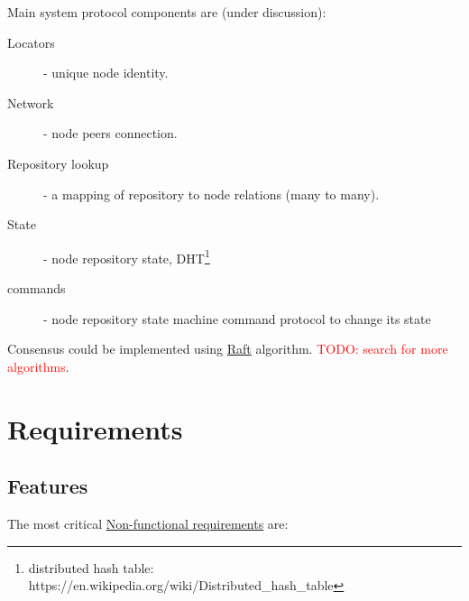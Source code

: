 \documentclass[12pt,oneside]{article}
\newcommand{\todo}[1]{\textcolor{red}{TODO: #1}}
\begin{document}
Main system protocol components are (under discussion):
\begin{description}
  \item[Locators] - unique node identity.
  \item[Network] - node peers connection.
  \item[Repository lookup] - a mapping of repository to node relations (many to many).
  \item[State] - node repository state,
    DHT\footnote{distributed hash table: https://en.wikipedia.org/wiki/Distributed\_hash\_table}
  \item[commands] - node repository state machine command protocol to change its state
\end{description}

Consensus could be implemented using \href{https://raft.github.io/raft.pdf}{Raft} algorithm.
\todo{search for more algorithms}.

\section{Requirements}
\label{sec:requirements}

\subsection{Features}
\label{sec:features}

The most critical
\href{https://en.wikipedia.org/wiki/Non-functional_requirement}{Non-functional requirements}
are:
\end{document}
